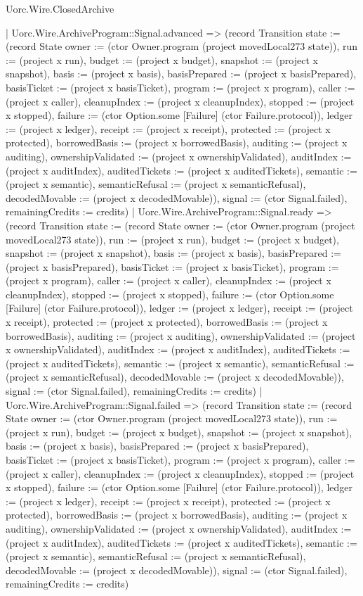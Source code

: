 \begin{lexlean}{Uorc.Wire.ClosedArchive}
\begin{semanticmodule}
{          | Uorc.Wire.ArchiveProgram::Signal.advanced => (record Transition {state := (record State {owner := (ctor Owner.program (project movedLocal273 state)), run := (project x run), budget := (project x budget), snapshot := (project x snapshot), basis := (project x basis), basisPrepared := (project x basisPrepared), basisTicket := (project x basisTicket), program := (project x program), caller := (project x caller), cleanupIndex := (project x cleanupIndex), stopped := (project x stopped), failure := (ctor Option.some [Failure] (ctor Failure.protocol)), ledger := (project x ledger), receipt := (project x receipt), protected := (project x protected), borrowedBasis := (project x borrowedBasis), auditing := (project x auditing), ownershipValidated := (project x ownershipValidated), auditIndex := (project x auditIndex), auditedTickets := (project x auditedTickets), semantic := (project x semantic), semanticRefusal := (project x semanticRefusal), decodedMovable := (project x decodedMovable)}), signal := (ctor Signal.failed), remainingCredits := credits})
          | Uorc.Wire.ArchiveProgram::Signal.ready => (record Transition {state := (record State {owner := (ctor Owner.program (project movedLocal273 state)), run := (project x run), budget := (project x budget), snapshot := (project x snapshot), basis := (project x basis), basisPrepared := (project x basisPrepared), basisTicket := (project x basisTicket), program := (project x program), caller := (project x caller), cleanupIndex := (project x cleanupIndex), stopped := (project x stopped), failure := (ctor Option.some [Failure] (ctor Failure.protocol)), ledger := (project x ledger), receipt := (project x receipt), protected := (project x protected), borrowedBasis := (project x borrowedBasis), auditing := (project x auditing), ownershipValidated := (project x ownershipValidated), auditIndex := (project x auditIndex), auditedTickets := (project x auditedTickets), semantic := (project x semantic), semanticRefusal := (project x semanticRefusal), decodedMovable := (project x decodedMovable)}), signal := (ctor Signal.failed), remainingCredits := credits})
          | Uorc.Wire.ArchiveProgram::Signal.failed => (record Transition {state := (record State {owner := (ctor Owner.program (project movedLocal273 state)), run := (project x run), budget := (project x budget), snapshot := (project x snapshot), basis := (project x basis), basisPrepared := (project x basisPrepared), basisTicket := (project x basisTicket), program := (project x program), caller := (project x caller), cleanupIndex := (project x cleanupIndex), stopped := (project x stopped), failure := (ctor Option.some [Failure] (ctor Failure.protocol)), ledger := (project x ledger), receipt := (project x receipt), protected := (project x protected), borrowedBasis := (project x borrowedBasis), auditing := (project x auditing), ownershipValidated := (project x ownershipValidated), auditIndex := (project x auditIndex), auditedTickets := (project x auditedTickets), semantic := (project x semantic), semanticRefusal := (project x semanticRefusal), decodedMovable := (project x decodedMovable)}), signal := (ctor Signal.failed), remainingCredits := credits})
}
\end{semanticmodule}
\end{lexlean}
